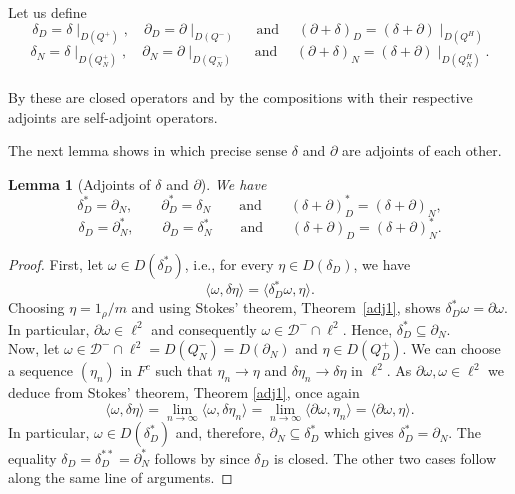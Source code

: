 \documentclass[10pt]{amsart}
\newtheorem{lemma}[theorem]{Lemma}
\theoremstyle{definition}
\newcommand{\F}{{F}}
\begin{document}
Let us define $$ \delta_D=\delta\mid_{D(Q^+)}, \quad \partial_D=\partial\mid_{D(Q^-)} \quad\mbox{ and }\quad  (\partial+\delta)_D=(\delta+\partial)\mid_{D(Q^H)} $$ %
 $$\delta_N=\delta\mid_{D(Q^+_N)} ,\quad \partial_N=\partial\mid_{D(Q^-_N)} \quad \mbox{ and }\quad(\partial+\delta)_N=(\delta+\partial)\mid_{D(Q^H_N)} .$$\\
By \cite[Theorem 5.1]{W} these are closed operators and by \cite[Theorem~5.39]{W} the compositions with their respective adjoints are self-adjoint operators.



The next lemma shows in which precise sense  $\delta$ and $\partial$ are adjoints of each other.
\begin{lemma}[Adjoints of $\delta$ and $\partial$]\label{d*}
    We have 
   $$\delta^*_D = \partial_N,\qquad\partial^*_D = \delta_N\qquad\mbox{and}\qquad(\delta+\partial)^*_D = (\delta+\partial)_N,$$
    $$\delta_D = \partial^*_N,\qquad\partial_D = \delta^*_N\qquad\mbox{and}\qquad(\delta+\partial)_D = (\delta+\partial)^*_N.$$
\end{lemma}
\begin{proof}
    First, let $\omega\in D(\delta^*_D)$, i.e., for every $\eta\in  D(\delta_D)$, we have
    $$\langle\omega,\delta\eta\rangle = \langle\delta^*_D\omega,\eta\rangle.$$
    Choosing $\eta = 1_\rho\slash m$ and using Stokes' theorem, Theorem~\ref{adj1}, shows $\delta^*_D\omega = \partial\omega.$ In particular, $\partial\omega\in\ell^2$ and consequently $\omega\in\mathcal{D}^-\cap\ell^2.$ Hence, $\delta^*_D \subseteq \partial_N.$\\
    Now, let $\omega\in\mathcal{D}^-\cap\ell^2=D(Q_{N}^{-})=D(\partial_{N})$ and $\eta\in D(Q^+_D).$ We can choose a sequence $(\eta_n)$ in $\F^c$ such that $\eta_n\rightarrow\eta$ and $\delta\eta_n\rightarrow\delta\eta$  in $\ell^2.$ As $\partial\omega,\omega\in\ell^2$ we deduce from Stokes' theorem, Theorem \ref{adj1}, once again
    $$\langle\omega,\delta\eta\rangle = \lim_{n\to\infty}\langle\omega,\delta\eta_n\rangle = \lim_{n\to\infty}\langle\partial\omega,\eta_n\rangle = \langle\partial\omega,\eta\rangle.$$
    In particular, $\omega\in D(\delta^*_D)$ and, therefore, $  \partial_N\subseteq \delta^*_D$ which gives $\delta^*_D = \partial_N.$ The equality $\delta_D=\delta_{D}^{**} = \partial_N^*$ follows by  \cite[Theorem~5.3~(b)]{W} since $\delta_{D}$ is closed.
    The other two cases follow along the same line of arguments.
\end{proof}
\end{document}
